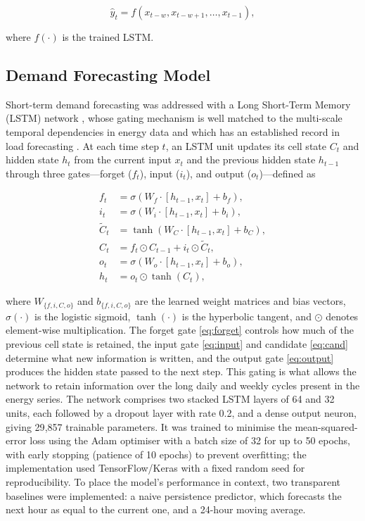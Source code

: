 \documentclass[conference]{IEEEtran}
\begin{document}
\begin{equation}
\hat{y}_{t} = f\!\left(x_{t-w}, x_{t-w+1}, \dots, x_{t-1}\right), \label{eq:window}
\end{equation}
 
where $f(\cdot)$ is the trained LSTM.
 
\subsection{Demand Forecasting Model}
Short-term demand forecasting was addressed with a Long Short-Term Memory (LSTM)
network \cite{hochreiter1997long}, whose gating mechanism is well matched to the
multi-scale temporal dependencies in energy data and which has an established
record in load forecasting \cite{kong2017short}. At each time step $t$, an LSTM unit updates its cell state $C_t$ and hidden
state $h_t$ from the current input $x_t$ and the previous hidden state
$h_{t-1}$ through three gates---forget ($f_t$), input ($i_t$), and output
($o_t$)---defined as
 
\begin{align}
f_t &= \sigma\!\left(W_f \cdot [h_{t-1}, x_t] + b_f\right), \label{eq:forget}\\
i_t &= \sigma\!\left(W_i \cdot [h_{t-1}, x_t] + b_i\right), \label{eq:input}\\
\tilde{C}_t &= \tanh\!\left(W_C \cdot [h_{t-1}, x_t] + b_C\right), \label{eq:cand}\\
C_t &= f_t \odot C_{t-1} + i_t \odot \tilde{C}_t, \label{eq:cell}\\
o_t &= \sigma\!\left(W_o \cdot [h_{t-1}, x_t] + b_o\right), \label{eq:output}\\
h_t &= o_t \odot \tanh(C_t), \label{eq:hidden}
\end{align}
 
where $W_{\{f,i,C,o\}}$ and $b_{\{f,i,C,o\}}$ are the learned weight matrices and
bias vectors, $\sigma(\cdot)$ is the logistic sigmoid, $\tanh(\cdot)$ is the
hyperbolic tangent, and $\odot$ denotes element-wise multiplication. The forget
gate \eqref{eq:forget} controls how much of the previous cell state is retained,
the input gate \eqref{eq:input} and candidate \eqref{eq:cand} determine what new
information is written, and the output gate \eqref{eq:output} produces the hidden
state passed to the next step. This gating is what allows the network to retain
information over the long daily and weekly cycles present in the energy series. The network comprises two
stacked LSTM layers of 64 and 32 units, each followed by a dropout layer with
rate 0.2, and a dense output neuron, giving 29{,}857 trainable parameters. It
was trained to minimise the mean-squared-error loss using the Adam optimiser
with a batch size of 32 for up to 50 epochs, with early stopping (patience of 10
epochs) to prevent overfitting; the implementation used TensorFlow/Keras
\cite{abadi2016tensorflow} with a fixed random seed for reproducibility. To place
the model's performance in context, two transparent baselines were implemented:
a naive persistence predictor, which forecasts the next hour as equal to the
current one, and a 24-hour moving average.
 
\end{document}
